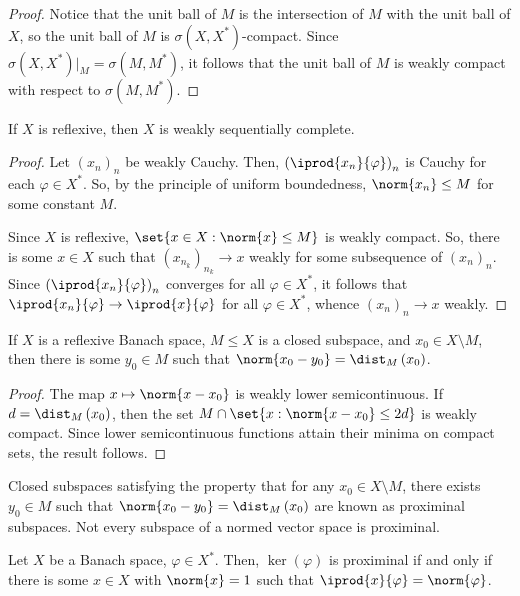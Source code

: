\documentclass[10pt]{mypackage}
\begin{document}
\begin{proof}
  Notice that the unit ball of $M$ is the intersection of $M$ with the unit ball of $X$, so the unit ball of $M$ is $\sigma\left( X,X^{\ast} \right)$-compact. Since $\sigma\left( X,X^{\ast} \right)|_{M} = \sigma\left( M,M^{\ast} \right)$, it follows that the unit ball of $M$ is weakly compact with respect to $\sigma\left( M,M^{\ast} \right)$.
\end{proof}
\begin{corollary}
  If $X$ is reflexive, then $X$ is weakly sequentially complete.
\end{corollary}
\begin{proof}
  Let $\left( x_n \right)_n$ be weakly Cauchy. Then, $ \left( \iprod{x_n}{\varphi} \right)_n $ is Cauchy for each $\varphi\in X^{\ast}$. So, by the principle of uniform boundedness, $\norm{x_n} \leq M$ for some constant $M$.

  Since $X$ is reflexive, $\set{x\in X : \norm{x}\leq M}$ is weakly compact. So, there is some $x\in X$ such that $\left( x_{n_k} \right)_{n_k}\rightarrow x$ weakly for some subsequence of $\left( x_n \right)_n$. Since $\left( \iprod{x_n}{\varphi} \right)_n$ converges for all $\varphi\in X^{\ast}$, it follows that $ \iprod{x_n}{\varphi}\rightarrow \iprod{x}{\varphi} $ for all $\varphi\in X^{\ast}$, whence $\left( x_n \right)_n\rightarrow x$ weakly.
\end{proof}
\begin{corollary}
  If $X$ is a reflexive Banach space, $M\leq X$ is a closed subspace, and $x_0\in X\setminus M$, then there is some $y_0\in M$ such that $\norm{x_0-y_0} = \dist_M\left(x_0\right)$.
\end{corollary}
\begin{proof}
  The map $x\mapsto \norm{x-x_0}$ is weakly lower semicontinuous. If $d = \dist_M\left( x_0 \right)$, then the set $M\cap \set{x : \norm{x-x_0} \leq 2d}$ is weakly compact. Since lower semicontinuous functions attain their minima on compact sets, the result follows.
\end{proof}
Closed subspaces satisfying the property that for any $x_0\in X\setminus M$, there exists $y_0\in M$ such that $\norm{x_0-y_0} = \dist_M\left( x_0 \right)$ are known as proximinal subspaces. Not every subspace of a normed vector space is proximinal.
\begin{proposition}
  Let $X$ be a Banach space, $\varphi\in X^{\ast}$. Then, $\ker\left( \varphi \right)$ is proximinal if and only if there is some $x\in X$ with $\norm{x} = 1$ such that $ \iprod{x}{\varphi} = \norm{\varphi} $.
\end{proposition}
\end{document}
